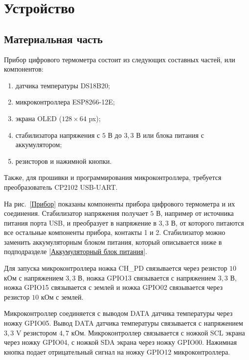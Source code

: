 \documentclass[12pt]{extarticle}
\begin{document}
\section{Устройство}\label{Устройство}

\subsection{Материальная часть}\label{Материальная часть}
Прибор цифрового термометра состоит из следующих составных частей, или компонентов: 
\begin{enumerate}
\item датчика температуры DS18B20;
\item микроконтроллера ESP8266-12E;
\item экрана OLED ($128\times64$ px);
\item стабилизатора напряжения с $5$ В до $3{,}3$ В или блока питания с аккумулятором;
\item резисторов и нажимной кнопки.
\end{enumerate}

Также, для прошивки и программирования микроконтроллера, требуется преобразователь CP2102 USB-UART.

\noindent%
\begin{minipage}{\linewidth}%
\centering

\label{Прибор}
\vspace{4mm}
\end{minipage}

На рис.~\ref{Прибор} показаны компоненты прибора цифрового термометра и их соединения. Стабилизатор напряжения получает $5$ В, например от источника питания порта USB, и преобразует в напряжение в $3{,}3$ В, от которого питаются все остальные компоненты прибора, контакты 1 и 2. Стабилизатор можно заменить аккумуляторным блоком питания, который описывается ниже в подподразделе \ref{Аккумуляторный блок питания}.

Для запуска микроконтроллера ножка CH\_PD связывается через резистор $10$ кОм с напряжением $3{,}3$ В, ножка GPIO13 связывается с напряжением $3{,}3$ В, ножка GPIO15 связывается с землей и ножка GPIO02 связывается через резистор $10$ кОм с землей. 

Микроконтроллер соединяется с выводом DATA датчика температуры через ножку GPIO05. Вывод DATA датчика температуры связывается с напряжением $3{,}3$ V резистором $4{,}7$ кОм. Микроконтроллер связывается с ножкой SCL экрана через ножку GPIO04, с ножкой SDA экрана через ножку GPIO00. %
Нажимная кнопка подает отрицательный сигнал на ножку GPIO12 микроконтроллера.
\end{document}
